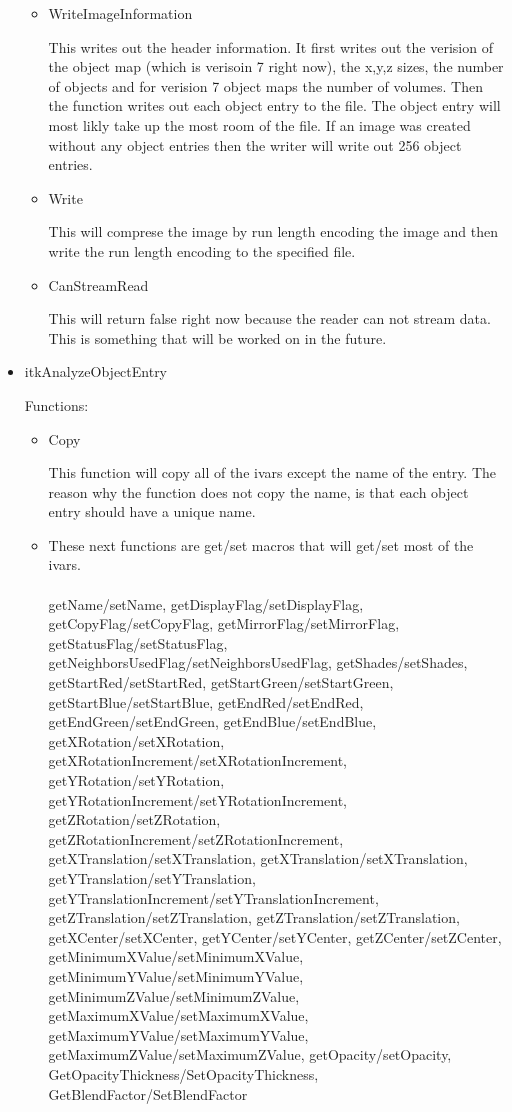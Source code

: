 \documentclass{InsightArticle}
\begin{document}
\begin{itemize}
\begin{itemize}
\item WriteImageInformation

This writes out the header information.  It first writes out the verision of the object map (which is verisoin 7 right now), the x,y,z sizes, the number of objects and for verision 7 object maps the number of volumes.  Then the function writes out each object entry to the file.  The object entry will most likly take up the most room of the file.  If an image was created without any object entries then the writer will write out 256 object entries.

\item Write

This will comprese the image by run length encoding the image and then write the run length encoding to the specified file.

\item CanStreamRead

This will return false right now because the reader can not stream data.  This is something that will be worked on in the future.

\end{itemize}

\item itkAnalyzeObjectEntry

Functions:
\begin{itemize}
      
      \item Copy
       
      This function will copy all of the ivars except the name of the entry.  The reason why the function does not copy the name, is that each object entry should have a unique name.

      \item These next functions are get/set macros that will get/set most of the ivars.\\ \\

         getName/setName, getDisplayFlag/setDisplayFlag, getCopyFlag/setCopyFlag, getMirrorFlag/setMirrorFlag, getStatusFlag/setStatusFlag, getNeighborsUsedFlag/setNeighborsUsedFlag, getShades/setShades, getStartRed/setStartRed, getStartGreen/setStartGreen, getStartBlue/setStartBlue, getEndRed/setEndRed, getEndGreen/setEndGreen, getEndBlue/setEndBlue, getXRotation/setXRotation, getXRotationIncrement/setXRotationIncrement, getYRotation/setYRotation, getYRotationIncrement/setYRotationIncrement, getZRotation/setZRotation, getZRotationIncrement/setZRotationIncrement, getXTranslation/setXTranslation, getXTranslation/setXTranslation, getYTranslation/setYTranslation, getYTranslationIncrement/setYTranslationIncrement, getZTranslation/setZTranslation, getZTranslation/setZTranslation, getXCenter/setXCenter, getYCenter/setYCenter, getZCenter/setZCenter, getMinimumXValue/setMinimumXValue, getMinimumYValue/setMinimumYValue, getMinimumZValue/setMinimumZValue, getMaximumXValue/setMaximumXValue, getMaximumYValue/setMaximumYValue, getMaximumZValue/setMaximumZValue, getOpacity/setOpacity,   GetOpacityThickness/SetOpacityThickness, GetBlendFactor/SetBlendFactor\\ \\


\end{itemize}
\end{itemize}
\end{document}

